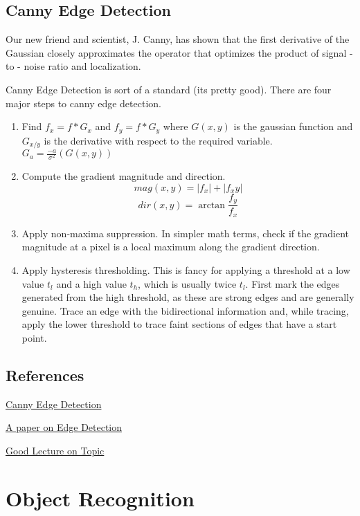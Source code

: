 \subsection{Canny Edge Detection}
Our new friend and scientist, J. Canny, has shown that the first derivative of the Gaussian closely approximates the operator that optimizes the product of signal - to - noise ratio and localization.

Canny Edge Detection is sort of a standard (its pretty good). There are four major steps to canny edge detection.
\begin{enumerate}
	\item Find $f_x = f * G_x$ and $f_y = f * G_y$ where $G(x,y)$ is the gaussian function and $G_{x/y}$ is the derivative with respect to the required variable. $G_a = \frac{-a}{\sigma^2}(G(x,y))$
	\item Compute the gradient magnitude and direction.\[ mag(x,y) = \left| f_x \right| + \left| f_xy \right| \] \[dir(x,y) = \arctan{\frac{f_y}{f_x}}\]
	\item Apply non-maxima suppression. In simpler math terms, check if the gradient magnitude at a pixel is a local maximum along the gradient direction.
	\item Apply hysteresis thresholding. This is fancy for applying a threshold at a low value $t_l$ and a high value $t_h$, which is usually twice $t_l$. First mark the edges generated from the high threshold, as these are strong edges and are generally genuine. Trace an edge with the bidirectional information and, while tracing, apply the lower threshold to trace faint sections of edges that have a start point.
\end{enumerate}


\subsection{References}
\href{http://fourier.eng.hmc.edu/e161/lectures/canny/node1.html}{Canny Edge Detection}

\href{https://pdfs.semanticscholar.org/d5c1/d380263318c1b7a7d298500b3617e55ef2fa.pdf}{A paper on Edge Detection}

\href{http://www.me.umn.edu/courses/me5286/vision/VisionNotes/2017/ME5286-Lecture7-2017-EdgeDetection2.pdf}{Good Lecture on Topic}

\section{Object Recognition}